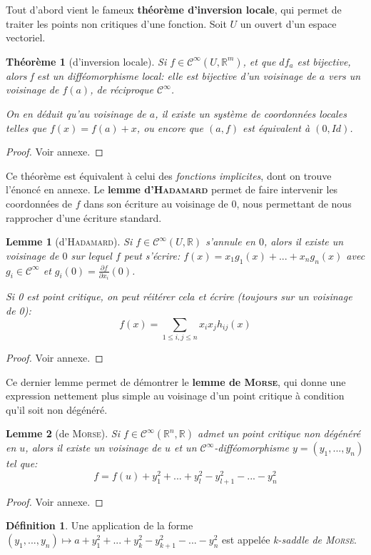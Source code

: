 \documentclass{article}
\newcommand{\cinf}{\mathcal{C}^\infty}
\newcommand{\R}{\mathbb{R}}
\newtheorem{thm}{Théorème}
\newtheorem{lemm}{Lemme}
\theoremstyle{definition}
\newtheorem{defn}{Définition}
\begin{document}
Tout d'abord vient le fameux \textbf{théorème d'inversion locale}, qui permet de traiter les points non critiques d'une fonction. Soit $U$ un ouvert d'un espace vectoriel.
\begin{thm}[d'inversion locale]
	Si $f\in\cinf(U,\R^m)$, et que $df_a$ est bijective, alors f est un difféomorphisme local: elle est bijective d'un voisinage de $a$ vers un voisinage de $f(a)$, de réciproque $\cinf$.

	On en déduit qu'au voisinage de $a$, il existe un système de coordonnées locales telles que $f(x)=f(a)+x$, ou encore que $(a,f)$ est équivalent à $(0,Id)$.
\end{thm}
\begin{proof} Voir annexe. \end{proof}

Ce théorème est équivalent à celui des \textit{fonctions implicites}, dont on trouve l'énoncé en annexe.
Le \textbf{lemme d'\textsc{Hadamard}} permet de faire intervenir les coordonnées de $f$ dans son écriture au voisinage de $0$, nous permettant de nous rapprocher d'une écriture standard.
\begin{lemm}[d'\textsc{Hadamard}]
	Si $f\in\cinf(U,\R)$ s'annule en $0$, alors il existe un voisinage de $0$ sur lequel $f$ peut s'écrire: $f(x)=x_1g_1(x)+...+x_ng_n(x)$ avec $g_i\in\cinf$ et $g_i(0) = \frac{\partial f}{\partial x_i}(0)$.

	Si 0 est point critique, on peut réitérer cela et écrire (toujours sur un voisinage de 0):
	$$f(x)=\sum_{1\leq i,j \leq n} x_ix_jh_{ij}(x)$$
\end{lemm}
\begin{proof} Voir annexe. \end{proof}

Ce dernier lemme permet de démontrer le \textbf{lemme de \textsc{Morse}}, qui donne une expression nettement plus simple au voisinage d'un point critique à condition qu'il soit non dégénéré.
\begin{lemm}[de \textsc{Morse}]
	Si $f\in\cinf(\R^n,\R)$ admet un point critique non dégénéré en $u$, alors il existe un voisinage de $u$ et un $\cinf$-difféomorphisme $y=(y_1,...,y_n)$ tel que:
	$$f=f(u)+y_1^2+...+y_l^2-y_{l+1}^2-...-y_n^2$$
\end{lemm}
\begin{proof} Voir annexe. \end{proof}
\begin{defn}
	Une application de la forme $(y_1,...,y_n)\mapsto a+y_1^2+...+y_k^2-y_{k+1}^2-...-y_n^2$ est appelée \textit{k-saddle de \textsc{Morse}}.
\end{defn}
\end{document}
